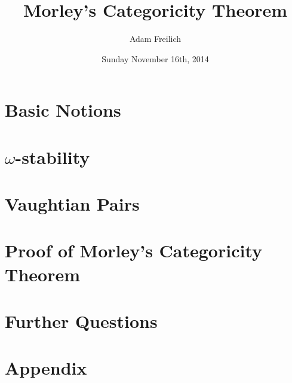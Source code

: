 \documentclass[10pt]{report}
\title{Morley's Categoricity Theorem}
\author{Adam Freilich}
\date{Sunday November 16th, 2014}
\theoremstyle{definition}
\begin{document}






\chapter{Basic Notions}



\chapter{\(\omega\)-stability}


\chapter{Vaughtian Pairs}


\chapter{Proof of Morley's Categoricity Theorem}


\chapter{Further Questions}


\appendix
\chapter{Appendix}

\end{document}
